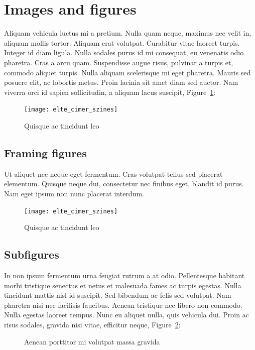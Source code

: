 	\section{Images and figures}

	Aliquam vehicula luctus mi a pretium. Nulla quam neque, maximus nec velit in, aliquam mollis tortor. Aliquam erat volutpat. Curabitur vitae laoreet turpis. Integer id diam ligula. Nulla sodales purus id mi consequat, eu venenatis odio pharetra. Cras a arcu quam. Suspendisse augue risus, pulvinar a turpis et, commodo aliquet turpis. Nulla aliquam scelerisque mi eget pharetra. Mauris sed posuere elit, ac lobortis metus. Proin lacinia sit amet diam sed auctor. Nam viverra orci id sapien sollicitudin, a aliquam lacus suscipit, Figure~\ref{fig:example-1}:

	\begin{figure}[H]
		\centering
		\texttt{[image: elte\_cimer\_szines]}
		\caption{Quisque ac tincidunt leo}
		\label{fig:example-1}
	\end{figure}

	\subsection{Framing figures}

	Ut aliquet nec neque eget fermentum. Cras volutpat tellus sed placerat elementum. Quisque neque dui, consectetur nec finibus eget, blandit id purus. Nam eget ipsum non nunc placerat interdum.

	\begin{figure}[H]
		\centering
		\texttt{[image: elte\_cimer\_szines]}
		\caption{Quisque ac tincidunt leo}
	\end{figure}

	\subsection{Subfigures}

	In non ipsum fermentum urna feugiat rutrum a at odio. Pellentesque habitant morbi tristique senectus et netus et malesuada fames ac turpis egestas. Nulla tincidunt mattis nisl id suscipit. Sed bibendum ac felis sed volutpat. Nam pharetra nisi nec facilisis faucibus. Aenean tristique nec libero non commodo. Nulla egestas laoreet tempus. Nunc eu aliquet nulla, quis vehicula dui. Proin ac risus sodales, gravida nisi vitae, efficitur neque, Figure~\ref{fig:example-2}:

	\begin{figure}[H]
		\centering
		\hspace{5pt}
		\caption{Aenean porttitor mi volutpat massa gravida}
		\label{fig:example-2}
	\end{figure}

